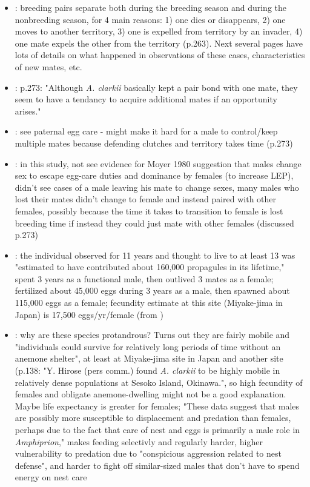 \documentclass[12pt, oneside]{article}   	%
\begin{document}
\begin{itemize}
\item \cite{ochi1989mating}: breeding pairs separate both during the breeding season and during the nonbreeding season, for 4 main reasons: 1) one dies or disappears, 2) one moves to another territory, 3) one is expelled from territory by an invader, 4) one mate expels the other from the territory (p.263). Next several pages have lots of details on what happened in observations of these cases, characteristics of new mates, etc.
\item \cite{ochi1989mating}: p.273: "Although \textit{A. clarkii} basically kept a pair bond with one mate, they seem to have a tendancy to acquire additional mates if an opportunity arises."
\item \cite{ochi1989mating}: see paternal egg care - might make it hard for a male to control/keep multiple mates because defending clutches and territory takes time (p.273)
\item \cite{ochi1989mating}: in this study, not see evidence for Moyer 1980 suggestion that males change sex to escape egg-care duties and dominance by females (to increase LEP), didn't see cases of a male leaving his mate to change sexes, many males who lost their mates didn't change to female and instead paired with other females, possibly because the time it takes to transition to female is lost breeding time if instead they could just mate with other females (discussed p.273)
\item \cite{moyer1986longevity}: the individual observed for 11 years and thought to live to at least 13 was "estimated to have contributed about 160,000 propagules in its lifetime," spent 3 years as a functional male, then outlived 3 mates as a female; fertilized about 45,000 eggs during 3 years as a male, then spawned about 115,000 eggs as a female; fecundity estimate at this site (Miyake-jima in Japan) is 17,500 eggs/yr/female (from \cite{bell1976notes})
\item \cite{moyer1986longevity}: why are these species protandrous? Turns out they are fairly mobile and "individuals could survive for relatively long periods of time without an anemone shelter", at least at Miyake-jima site in Japan and another site (p.138: "Y. Hirose (pers comm.) found \textit{A. clarkii} to be highly mobile in relatively dense populations at Sesoko Island, Okinawa.", so high fecundity of females and obligate anemone-dwelling might not be a good explanation. Maybe life expectancy is greater for females; "These data suggest that males are possibly more susceptible to displacement and predation than females, perhaps due to the fact that care of nest and eggs is primarily a male role in \textit{Amphiprion}," makes feeding selectivly and regularly harder, higher vulnerability to predation due to "conspicious aggression related to nest defense", and harder to fight off similar-sized males that don't have to spend energy on nest care
\end{itemize}
\end{document}
